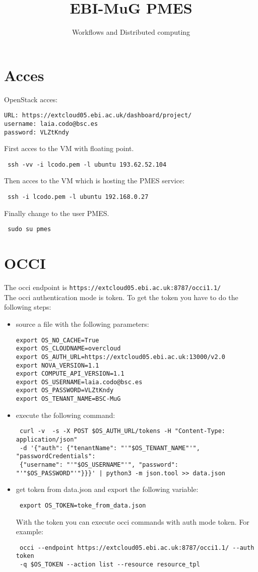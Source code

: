 \documentclass[a4paper,10pt]{article}
\title{EBI-MuG PMES}
\author{Workflows and Distributed computing}
\begin{document}
\maketitle

\section{Acces}
OpenStack acces:
\begin{verbatim}
URL: https://extcloud05.ebi.ac.uk/dashboard/project/
username: laia.codo@bsc.es
password: VLZtKndy
\end{verbatim}

First acces to the VM with floating point.
\begin{verbatim}
 ssh -vv -i lcodo.pem -l ubuntu 193.62.52.104
\end{verbatim}
Then acces to the VM which is hosting the PMES service:
\begin{verbatim}
 ssh -i lcodo.pem -l ubuntu 192.168.0.27
\end{verbatim}
Finally change to the user PMES.
\begin{verbatim}
 sudo su pmes
\end{verbatim}

\section{OCCI}
The occi endpoint is \texttt{https://extcloud05.ebi.ac.uk:8787/occi1.1/} \\
The occi authentication mode is token. To get the token you have to do the following steps:
\begin{itemize}
 \item source a file with the following parameters:
\begin{verbatim}
export OS_NO_CACHE=True
export OS_CLOUDNAME=overcloud
export OS_AUTH_URL=https://extcloud05.ebi.ac.uk:13000/v2.0
export NOVA_VERSION=1.1
export COMPUTE_API_VERSION=1.1
export OS_USERNAME=laia.codo@bsc.es
export OS_PASSWORD=VLZtKndy
export OS_TENANT_NAME=BSC-MuG
\end{verbatim}
\item execute the following command:
\begin{verbatim}
 curl -v  -s -X POST $OS_AUTH_URL/tokens -H "Content-Type: application/json" 
 -d '{"auth": {"tenantName": "'"$OS_TENANT_NAME"'", "passwordCredentials": 
 {"username": "'"$OS_USERNAME"'", "password": 
"'"$OS_PASSWORD"'"}}}' | python3 -m json.tool >> data.json
\end{verbatim}
\item get token from data.json and export the following variable:
\begin{verbatim}
 export OS_TOKEN=toke_from_data.json
\end{verbatim}

With the token you can execute occi commands with auth mode token. For example:
\begin{verbatim}
 occi --endpoint https://extcloud05.ebi.ac.uk:8787/occi1.1/ --auth token 
 -q $OS_TOKEN --action list --resource resource_tpl
\end{verbatim}

\end{itemize}
\end{document}
